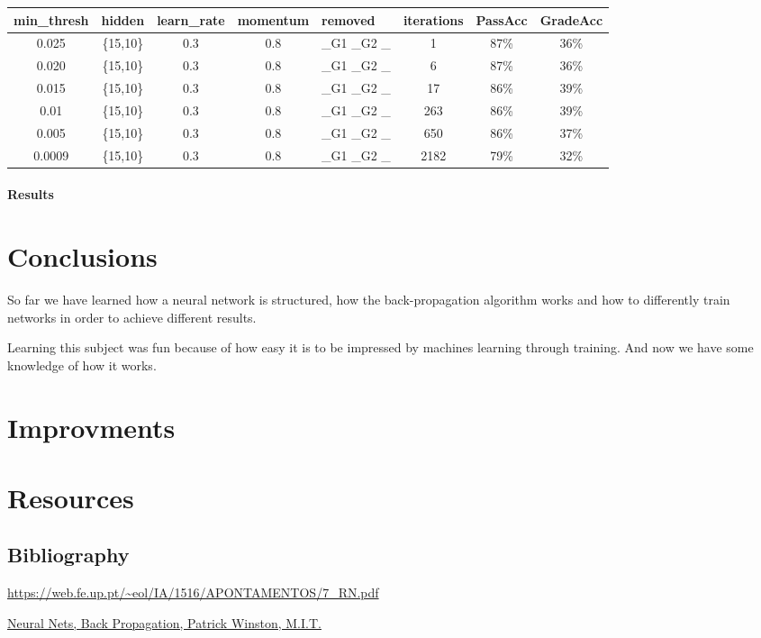 \documentclass[11pt]{article}
\begin{document}
\begin{tabular}{| c | c | c | c | p{3cm} | c | c | c |}
\hline \textbf{min\_thresh} & \textbf{hidden} & \textbf{learn\_rate} & \textbf{momentum} & \textbf{removed} & \textbf{iterations} & \textbf{PassAcc} & \textbf{GradeAcc}\\
\hline 0.025 & \{15,10\} & 0.3 & 0.8 & \_G1 \_G2 \_ & 1 & 87\% & 36\%\\
\hline 0.020 & \{15,10\} & 0.3 & 0.8 & \_G1 \_G2 \_ & 6 & 87\% & 36\%\\
\hline 0.015 & \{15,10\} & 0.3 & 0.8 & \_G1 \_G2 \_ & 17 & 86\% & 39\%\\
\hline 0.01 & \{15,10\} & 0.3 & 0.8 & \_G1 \_G2 \_ & 263 & 86\% & 39\%\\
\hline 0.005 & \{15,10\} & 0.3 & 0.8 & \_G1 \_G2 \_ & 650 & 86\% & 37\%\\
\hline 0.0009 & \{15,10\} & 0.3 & 0.8 & \_G1 \_G2 \_ & 2182 & 79\% & 32\%\\
\hline
\end{tabular}
\paragraph{Results}
\section{Conclusions}
So far we have learned how a neural network is structured, how the back-propagation algorithm works and how to differently train networks in order to achieve different results.

Learning this subject was fun because of how easy it is to be impressed by machines learning through training. And now we have some knowledge of how it works.
\section{Improvments}

\section{Resources}

\subsection{Bibliography}

\url{https://web.fe.up.pt/~eol/IA/1516/APONTAMENTOS/7_RN.pdf}

\href{https://www.youtube.com/watch?v=q0pm3BrIUFo}{Neural Nets, Back Propagation, Patrick Winston, M.I.T.}
\end{document}
